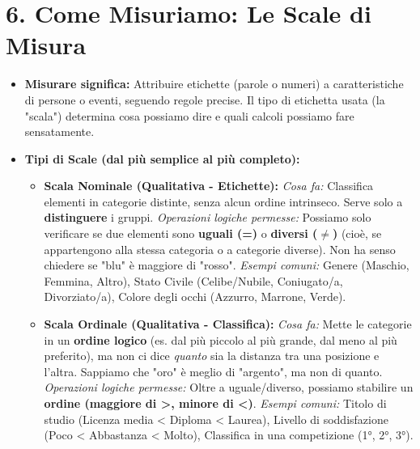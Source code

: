 \documentclass[12pt, a4paper]{article}
\begin{document}
\section*{6. Come Misuriamo: Le Scale di Misura}
\begin{itemize}
    \item \textbf{Misurare significa:} Attribuire etichette (parole o numeri) a caratteristiche di persone o eventi, seguendo regole precise. Il tipo di etichetta usata (la "scala") determina cosa possiamo dire e quali calcoli possiamo fare sensatamente.
    \item \textbf{Tipi di Scale (dal più semplice al più completo):}
        \begin{itemize}
            \item \textbf{Scala Nominale (Qualitativa - Etichette):}
                \subitem \textit{Cosa fa:} Classifica elementi in categorie distinte, senza alcun ordine intrinseco. Serve solo a \textbf{distinguere} i gruppi.
                \subitem \textit{Operazioni logiche permesse:} Possiamo solo verificare se due elementi sono \textbf{uguali (=)} o \textbf{diversi ($\neq$)} (cioè, se appartengono alla stessa categoria o a categorie diverse). Non ha senso chiedere se "blu" è maggiore di "rosso".
                \subitem \textit{Esempi comuni:} Genere (Maschio, Femmina, Altro), Stato Civile (Celibe/Nubile, Coniugato/a, Divorziato/a), Colore degli occhi (Azzurro, Marrone, Verde).

            \item \textbf{Scala Ordinale (Qualitativa - Classifica):}
                \subitem \textit{Cosa fa:} Mette le categorie in un \textbf{ordine logico} (es. dal più piccolo al più grande, dal meno al più preferito), ma non ci dice \textit{quanto} sia la distanza tra una posizione e l'altra. Sappiamo che "oro" è meglio di "argento", ma non di quanto.
                \subitem \textit{Operazioni logiche permesse:} Oltre a uguale/diverso, possiamo stabilire un \textbf{ordine (maggiore di >, minore di <)}.
                \subitem \textit{Esempi comuni:} Titolo di studio (Licenza media < Diploma < Laurea), Livello di soddisfazione (Poco < Abbastanza < Molto), Classifica in una competizione (1°, 2°, 3°).


\end{itemize}
\end{itemize}
\end{document}
